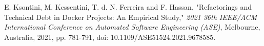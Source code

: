 \documentclass[lettersize,journal]{IEEEtran}
\begin{document}
\begin{thebibliography}{1}


E. Ksontini, M. Kessentini, T. d. N. Ferreira and F. Hassan, "Refactorings and Technical Debt in Docker Projects: An Empirical Study," \textit{2021 36th IEEE/ACM International Conference on Automated Software Engineering (ASE)}, Melbourne, Australia, 2021, pp. 781-791, doi: 10.1109/ASE51524.2021.9678585.

\end{thebibliography}

\vfill
\end{document}
